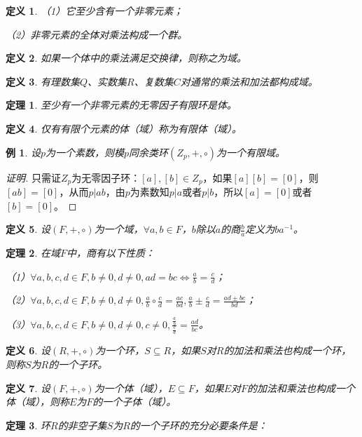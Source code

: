 \documentclass{article}
\newtheorem{Def}{定义}
\newtheorem{Thm}{定理}
\newtheorem*{Example}{例}
\begin{document}
\begin{CJK*}{UTF8}{gbsn}
\begin{Def}
    （1）它至少含有一个非零元素；
  
    （2）非零元素的全体对乘法构成一个群。
  \end{Def}
  
  \begin{Def}
    如果一个体中的乘法满足交换律，则称之为域。
  \end{Def}
  \begin{Def}
    有理数集$Q$、实数集$R$、复数集$C$对通常的乘法和加法都构成域。
  \end{Def}
  \begin{Thm}
    至少有一个非零元素的无零因子有限环是体。
  \end{Thm}
  \begin{Def}
    仅有有限个元素的体（域）称为有限体（域）。
  \end{Def}
  \begin{Example}
    设$p$为一个素数，则模$p$同余类环$(Z_p,+,\circ)$为一个有限域。
  \end{Example}
  \begin{proof}[证明]
    只需证$Z_p$为无零因子环：\forall $[a],[b]\in Z_p$，如果$[a][b]=[0]$，则$[ab]=[0]$，从而$p|ab$，由$p$为素数知$p|a$或者$p|b$，所以$[a]=[0]$或者$[b]=[0]$。
  \end{proof}
  \begin{Def}
    设$(F,+,\circ)$为一个域，$\forall a,b\in F$，$b$除以$a$的商$\frac{b}{a}$定义为$ba^{-1}$。
  \end{Def}
  \begin{Thm}
    在域$F$中，商有以下性质：
  
    （1）$\forall a,b,c,d\in F, b\neq 0, d\neq 0, ad=bc \Leftrightarrow \frac{a}{b} = \frac{c}{d}$；
  
    （2）$\forall a,b,c,d\in F, b\neq 0, d\neq 0, \frac{a}{b}\circ \frac{c}{d}=\frac{ac}{bd}, \frac{a}{b}\pm\frac{c}{d}=\frac{ad\pm bc}{bd}$；
  
    （3）$\forall a,b,c,d\in F, b\neq 0, d\neq 0,c\neq 0, \frac{\frac{a}{b}}{\frac{c}{d}}=\frac{ad}{bc}$。
  \end{Thm}
  
  \begin{Def}
    设$(R,+,\circ)$为一个环，$S\subseteq R$，如果$S$对$R$的加法和乘法也构成一个环，则称$S$为$R$的一个子环。
  \end{Def}
  
  \begin{Def}
    设$(F,+,\circ)$为一个体（域），$E\subseteq F$，如果$E$对$F$的加法和乘法也构成一个体（域），则称$E$为$F$的一个子体（域）。
  \end{Def}
  \begin{Thm}
    环$R$的非空子集$S$为$R$的一个子环的充分必要条件是：
  

\end{Thm}
\end{CJK*}
\end{document}
